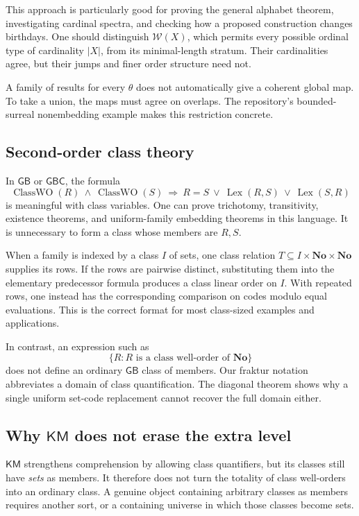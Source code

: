 \documentclass[11pt]{article}
\theoremstyle{definition}
\theoremstyle{remark}
\newcommand{\No}{\mathbf{No}}
\newcommand{\WO}{\mathcal W}
\newcommand{\GB}{\mathsf{GB}}
\newcommand{\GBC}{\mathsf{GBC}}
\newcommand{\KM}{\mathsf{KM}}
\newcommand{\card}[1]{\lvert #1\rvert}
\begin{document}
This approach is particularly good for proving the general alphabet
theorem, investigating cardinal spectra, and checking how a proposed
construction changes birthdays. One should distinguish \(\WO(X)\),
which permits every possible ordinal type of cardinality \(\card X\),
from its minimal-length stratum. Their cardinalities agree, but
their jumps and finer order structure need not.

A family of results for every \(\theta\) does not automatically give
a coherent global map. To take a union, the maps must agree on overlaps.
The repository's bounded-surreal nonembedding example makes this
restriction concrete.

\subsection{Second-order class theory}

In \(\GB\) or \(\GBC\), the formula
\[
 \operatorname{ClassWO}(R)\ \wedge\ \operatorname{ClassWO}(S)
 \ \Longrightarrow\
 R=S\ \vee\ \operatorname{Lex}(R,S)\ \vee\ \operatorname{Lex}(S,R)
\]
is meaningful with class variables. One can prove trichotomy,
transitivity, existence theorems, and uniform-family embedding
theorems in this language. It is unnecessary to form a class
whose members are \(R,S\).

When a family is indexed by a class \(I\) of sets, one class
relation \(T\subseteq I\times\No\times\No\) supplies its rows.
If the rows are pairwise distinct, substituting them into the
elementary predecessor formula produces a class linear order on
\(I\). With repeated rows, one instead has the corresponding
comparison on codes modulo equal evaluations. This is the correct format for
most class-sized examples and applications.

In contrast, an expression such as
\[
 \{R:R\text{ is a class well-order of }\No\}
\]
does not define an ordinary \(\GB\) class of members. Our fraktur
notation abbreviates a domain of class quantification. The
diagonal theorem shows why a single uniform set-code replacement
cannot recover the full domain either.

\subsection{Why \texorpdfstring{\(\KM\)}{KM} does not erase the extra level}

\(\KM\) strengthens comprehension by allowing class quantifiers,
but its classes still have \emph{sets} as members. It therefore
does not turn the totality of class well-orders into an ordinary
class. A genuine object containing arbitrary classes as members
requires another sort, or a containing universe in which those
classes become sets.
\end{document}
